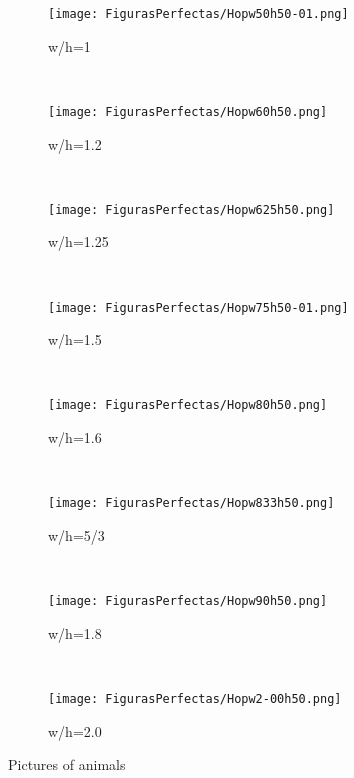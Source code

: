 \documentclass[letterpaper,10pt, jcp, aps]{revtex4-1}
\begin{document}
    \begin{figure}
    \centering
    \begin{subfigure}[b]{0.35\textwidth}
        \texttt{[image: FigurasPerfectas/Hopw50h50-01.png]}
        \caption{w/h=1}
        \label{wh1}
    \end{subfigure}
    ~ %
    \begin{subfigure}[b]{0.35\textwidth}
        \texttt{[image: FigurasPerfectas/Hopw60h50.png]}
        \caption{w/h=1.2}
        \label{wh12}
    \end{subfigure}
    \\
    \begin{subfigure}[b]{0.35\textwidth}
        \texttt{[image: FigurasPerfectas/Hopw625h50.png]}
        \caption{w/h=1.25}
        \label{wh125}
    \end{subfigure}
    ~ %
    \begin{subfigure}[b]{0.35\textwidth}
        \texttt{[image: FigurasPerfectas/Hopw75h50-01.png]}
        \caption{w/h=1.5}
        \label{wh15}
    \end{subfigure}
    \\
      \begin{subfigure}[b]{0.35\textwidth}
        \texttt{[image: FigurasPerfectas/Hopw80h50.png]}
        \caption{w/h=1.6}
        \label{wh16}
    \end{subfigure}
    ~ %
    \begin{subfigure}[b]{0.35\textwidth}
        \texttt{[image: FigurasPerfectas/Hopw833h50.png]}
        \caption{w/h=5/3}
        \label{wh53}
    \end{subfigure}
    \\
      \begin{subfigure}[b]{0.35\textwidth}
        \texttt{[image: FigurasPerfectas/Hopw90h50.png]}
        \caption{w/h=1.8}
        \label{wh1}
    \end{subfigure}
    ~ %
    \begin{subfigure}[b]{0.35\textwidth}
        \texttt{[image: FigurasPerfectas/Hopw2-00h50.png]}
        \caption{w/h=2.0}
        \label{wh18}
    \end{subfigure}
    \caption{Pictures of animals}\label{fig:animals}
\end{figure}
\end{document}
